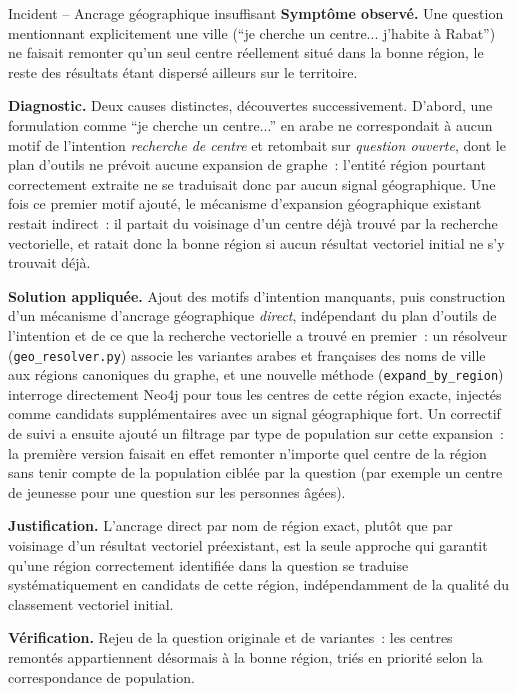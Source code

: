 \begin{probbox}{Incident -- Ancrage géographique insuffisant}
\textbf{Symptôme observé.} Une question mentionnant explicitement une ville (``je cherche un centre... j'habite à Rabat'') ne faisait remonter qu'un seul centre réellement situé dans la bonne région, le reste des résultats étant dispersé ailleurs sur le territoire.

\textbf{Diagnostic.} Deux causes distinctes, découvertes successivement. D'abord, une formulation comme ``je cherche un centre...'' en arabe ne correspondait à aucun motif de l'intention \emph{recherche de centre} et retombait sur \emph{question ouverte}, dont le plan d'outils ne prévoit aucune expansion de graphe~: l'entité région pourtant correctement extraite ne se traduisait donc par aucun signal géographique. Une fois ce premier motif ajouté, le mécanisme d'expansion géographique existant restait indirect~: il partait du voisinage d'un centre déjà trouvé par la recherche vectorielle, et ratait donc la bonne région si aucun résultat vectoriel initial ne s'y trouvait déjà.

\textbf{Solution appliquée.} Ajout des motifs d'intention manquants, puis construction d'un mécanisme d'ancrage géographique \emph{direct}, indépendant du plan d'outils de l'intention et de ce que la recherche vectorielle a trouvé en premier~: un résolveur (\texttt{geo\_resolver.py}) associe les variantes arabes et françaises des noms de ville aux régions canoniques du graphe, et une nouvelle méthode (\texttt{expand\_by\_region}) interroge directement Neo4j pour tous les centres de cette région exacte, injectés comme candidats supplémentaires avec un signal géographique fort. Un correctif de suivi a ensuite ajouté un filtrage par type de population sur cette expansion~: la première version faisait en effet remonter n'importe quel centre de la région sans tenir compte de la population ciblée par la question (par exemple un centre de jeunesse pour une question sur les personnes âgées).

\textbf{Justification.} L'ancrage direct par nom de région exact, plutôt que par voisinage d'un résultat vectoriel préexistant, est la seule approche qui garantit qu'une région correctement identifiée dans la question se traduise systématiquement en candidats de cette région, indépendamment de la qualité du classement vectoriel initial.

\textbf{Vérification.} Rejeu de la question originale et de variantes~: les centres remontés appartiennent désormais à la bonne région, triés en priorité selon la correspondance de population.
\end{probbox}


